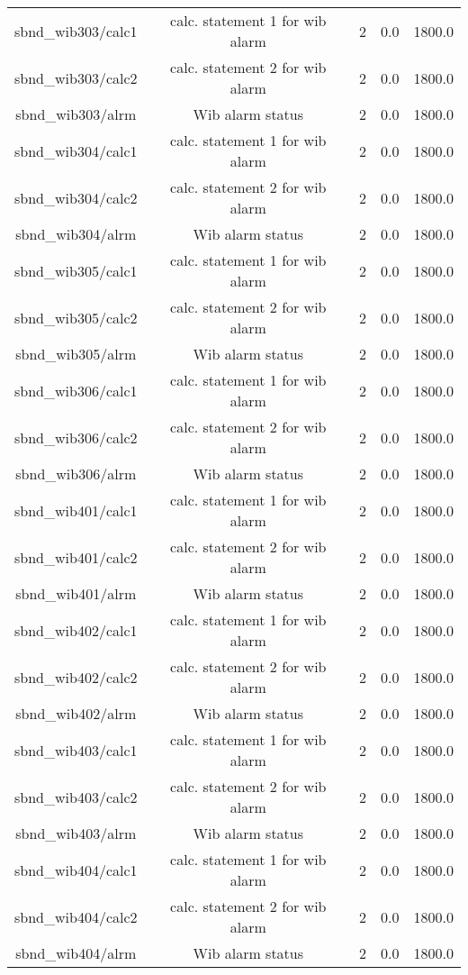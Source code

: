 \begin{table}[ptb]
\begin{tabular}{c | c c c c}
sbnd_wib303/calc1 & calc. statement 1 for wib alarm & 2 & 0.0 & 1800.0\\ 
sbnd_wib303/calc2 & calc. statement 2 for wib alarm & 2 & 0.0 & 1800.0\\ 
sbnd_wib303/alrm & Wib alarm status & 2 & 0.0 & 1800.0\\ 
sbnd_wib304/calc1 & calc. statement 1 for wib alarm & 2 & 0.0 & 1800.0\\ 
sbnd_wib304/calc2 & calc. statement 2 for wib alarm & 2 & 0.0 & 1800.0\\ 
sbnd_wib304/alrm & Wib alarm status & 2 & 0.0 & 1800.0\\ 
sbnd_wib305/calc1 & calc. statement 1 for wib alarm & 2 & 0.0 & 1800.0\\ 
sbnd_wib305/calc2 & calc. statement 2 for wib alarm & 2 & 0.0 & 1800.0\\ 
sbnd_wib305/alrm & Wib alarm status & 2 & 0.0 & 1800.0\\ 
sbnd_wib306/calc1 & calc. statement 1 for wib alarm & 2 & 0.0 & 1800.0\\ 
sbnd_wib306/calc2 & calc. statement 2 for wib alarm & 2 & 0.0 & 1800.0\\ 
sbnd_wib306/alrm & Wib alarm status & 2 & 0.0 & 1800.0\\ 
sbnd_wib401/calc1 & calc. statement 1 for wib alarm & 2 & 0.0 & 1800.0\\ 
sbnd_wib401/calc2 & calc. statement 2 for wib alarm & 2 & 0.0 & 1800.0\\ 
sbnd_wib401/alrm & Wib alarm status & 2 & 0.0 & 1800.0\\ 
sbnd_wib402/calc1 & calc. statement 1 for wib alarm & 2 & 0.0 & 1800.0\\ 
sbnd_wib402/calc2 & calc. statement 2 for wib alarm & 2 & 0.0 & 1800.0\\ 
sbnd_wib402/alrm & Wib alarm status & 2 & 0.0 & 1800.0\\ 
sbnd_wib403/calc1 & calc. statement 1 for wib alarm & 2 & 0.0 & 1800.0\\ 
sbnd_wib403/calc2 & calc. statement 2 for wib alarm & 2 & 0.0 & 1800.0\\ 
sbnd_wib403/alrm & Wib alarm status & 2 & 0.0 & 1800.0\\ 
sbnd_wib404/calc1 & calc. statement 1 for wib alarm & 2 & 0.0 & 1800.0\\ 
sbnd_wib404/calc2 & calc. statement 2 for wib alarm & 2 & 0.0 & 1800.0\\ 
sbnd_wib404/alrm & Wib alarm status & 2 & 0.0 & 1800.0\\ 

\end{tabular}
\end{table}
